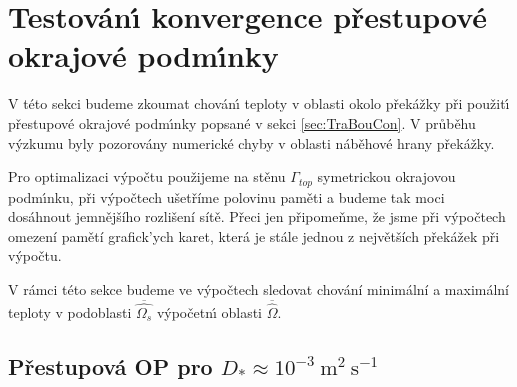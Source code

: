     \section{Testov\'{a}n\'{\i} konvergence p\v{r}estupov\'{e} okrajov\'{e} podm\'{\i}nky}
        
        V t\'{e}to sekci budeme zkoumat chov\'{a}n\'{\i} teploty v oblasti okolo p\v{r}ek\'{a}\v{z}ky p\v{r}i pou\v{z}it\'{\i} p\v{r}estupov\'{e} okrajov\'{e} podm\'{\i}nky popsan\'{e} v sekci \ref{sec:TraBouCon}. V pr\r{u}b\v{e}hu v\'{y}zkumu byly pozorov\'{a}ny numerick\'{e} chyby v oblasti n\'{a}b\v{e}hov\'{e} hrany p\v{r}ek\'{a}\v{z}ky. 


        Pro optimalizaci v\'{y}po\v{c}tu pou\v{z}ijeme na st\v{e}nu $\Gamma_{top}$ symetrickou okrajovou podm\'{\i}nku, p\v{r}i v\'{y}po\v{c}tech u\v{s}et\v{r}\'{i}me polovinu pam\v{e}ti a budeme tak moci dos\'{a}hnout jemn\v{e}j\v{s}\'{i}ho rozli\v{s}en\'{i} s\'{i}t\v{e}. P\v{r}eci jen p\v{r}ipome\v{n}me, \v{z}e jsme p\v{r}i v\'{y}po\v{c}tech omezen\'{i} pam\v{e}t\'{i} grafick'{y}ch karet, kter\'{a} je st\'{a}le jednou z nejv\v{e}t\v{s}\'{i}ch p\v{r}ek\'{a}\v{z}ek p\v{r}i v\'{y}po\v{c}tu.



        V r\'{a}mci t\'{e}to sekce budeme ve v\'{y}po\v{c}tech sledovat chov\'{a}n\'{i} minim\'{a}ln\'{i} a maxim\'{a}ln\'{i} teploty v podoblasti $\overline{\hat{\Omega_{s}}}$ v\'{y}po\v{c}etn\'{\i} oblasti $\overline{\hat{\Omega}}$. 




   

        
        

        \subsection{P\v{r}estupov\'{a} OP pro $D_* \approx 10^{-3} \ \mathrm{m}^{2} \ \mathrm{s}^{-1}$}
        \label{sub:D10m3}
        
